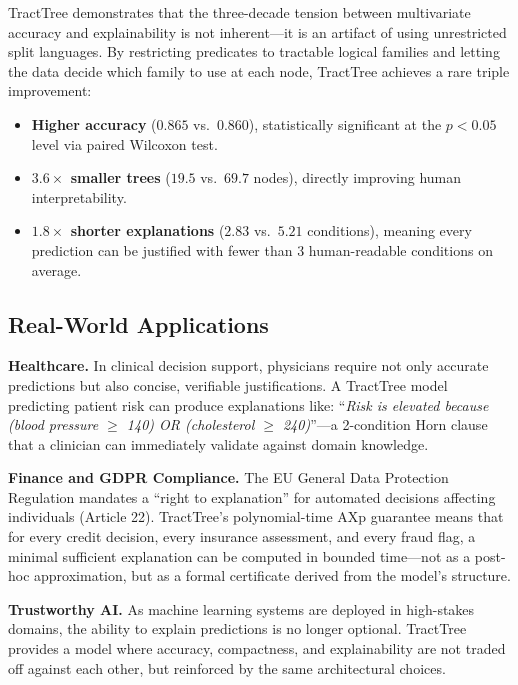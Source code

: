 \documentclass[11pt,a4paper]{article}
\begin{document}
TractTree demonstrates that the three-decade tension between multivariate accuracy and explainability is not inherent---it is an artifact of using unrestricted split languages. By restricting predicates to tractable logical families and letting the data decide which family to use at each node, TractTree achieves a rare triple improvement:

\begin{itemize}[leftmargin=2em]
    \item \textbf{Higher accuracy} ($0.865$ vs.\ $0.860$), statistically significant at the $p < 0.05$ level via paired Wilcoxon test.
    \item \textbf{$3.6\times$ smaller trees} ($19.5$ vs.\ $69.7$ nodes), directly improving human interpretability.
    \item \textbf{$1.8\times$ shorter explanations} ($2.83$ vs.\ $5.21$ conditions), meaning every prediction can be justified with fewer than 3 human-readable conditions on average.
\end{itemize}

\subsection{Real-World Applications}

\textbf{Healthcare.} In clinical decision support, physicians require not only accurate predictions but also concise, verifiable justifications. A TractTree model predicting patient risk can produce explanations like: ``\textit{Risk is elevated because (blood pressure $\geq$ 140) OR (cholesterol $\geq$ 240)}''---a 2-condition Horn clause that a clinician can immediately validate against domain knowledge.

\textbf{Finance and GDPR Compliance.} The EU General Data Protection Regulation mandates a ``right to explanation'' for automated decisions affecting individuals (Article 22). TractTree's polynomial-time AXp guarantee means that for every credit decision, every insurance assessment, and every fraud flag, a minimal sufficient explanation can be computed in bounded time---not as a post-hoc approximation, but as a formal certificate derived from the model's structure.

\textbf{Trustworthy AI.} As machine learning systems are deployed in high-stakes domains, the ability to explain predictions is no longer optional. TractTree provides a model where accuracy, compactness, and explainability are not traded off against each other, but reinforced by the same architectural choices.
\end{document}
